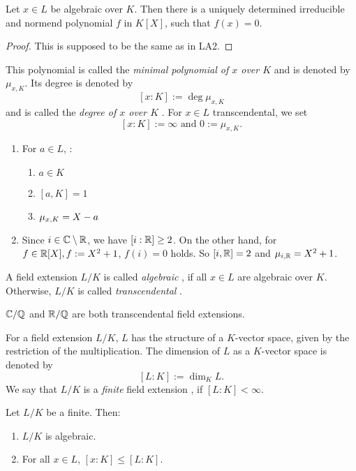 \color{purple}
\begin{prop}
  Let $x\in L$ be algebraic over $K$. Then there is a uniquely determined irreducible and normend polynomial $f$ in $K[X]$, such that $f(x)=0$.
\end{prop}
\begin{proof}
  This is supposed to be the same as in LA2.
\end{proof}
\color{black}
This polynomial is called the \emph{minimal polynomial of $x$ over $K$}  and is denoted by $\mu_{x,K}$. Its degree is denoted by
\[
[x:K]:= \deg \mu_{x,K}
\]
and is called the \emph{degree of $x$ over $K$} . For $x\in L$ transcendental, we set
\[
[x:K]:=\infty \text{ and }0:=\mu_{x,K}.
\]

\begin{bsp}
  \begin{enumerate}
    \item For $a\in L$, \tfae:
    \begin{enumerate}
      \item $a\in K$
      \item $[a,K]=1$
      \item $\mu_{x,K}=X-a$
    \end{enumerate}
  \item Since $i\in \mathbb{C}\setminus \mathbb{R}$, we have $[i:\mathbb{R}]\geq 2$. On the other hand, for $f\in \mathbb{R}[X],f:= X^2+1$, $f(i)=0$ holds. So $[i,\mathbb{R}]=2$ and $\mu_{i,\mathbb{R}}=X^2+1$.
\end{enumerate}
\end{bsp}
\begin{defn}
  A field extension $L/K$ is called \emph{algebraic} , if all $x\in L$ are algebraic over $K$. Otherwise, $L/K$ is called \emph{transcendental}  .
\end{defn}
\begin{bsp}
  $\mathbb{C}/\mathbb{Q}$ and $\mathbb{R}/\mathbb{Q}$ are both transcendental field extensions.
\end{bsp}
For a field extension $L/K$, $L$ has the structure of a $K$-vector space, given by the restriction of the multiplication. The dimension of $L$ as a $K$-vector space is denoted by
  \[
  [L:K]:=\dim_K L.
  \] We say that $L/K$ is a \emph{finite} field extension , if $[L:K]<\infty$.
\begin{lem}\label{3:fdalg}
  Let $L/K$ be a finite. Then:
  \begin{enumerate}
    \item $L/K$ is algebraic.
    \item For all $x\in L$, $[x:K]\leq [L:K]$.
  \end{enumerate}
\end{lem}
